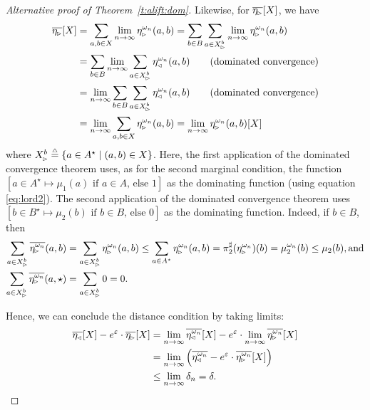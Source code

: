 \documentclass{lmcs}
\begin{document}
\begin{proof}[Alternative proof of Theorem~\ref{t:alift:dom}]
  Likewise, for $\overline{\eta\rside}[X]$, we have
  \begin{align*}
    \overline{\eta\rside}[X]
      &= \sum_{a, b \in X} \lim_{n \to \infty} \eta\rside^{\omega_n}(a, b)
       = \sum_{b \in B} \sum_{a \in X\rside^b} \lim_{n \to \infty} \eta\rside^{\omega_n}(a, b) \\
      &= \sum_{b \in B} \lim_{n \to \infty} \sum_{a \in X\rside^b} \eta\lside^{\omega_n}(a, b)
           \tag{dominated convergence} \\
      &= \lim_{n \to \infty} \sum_{b \in B} \sum_{a \in X\rside^b} \eta\lside^{\omega_n}(a, b)
           \tag{dominated convergence} \\
      &= \lim_{n \to \infty} \sum_{a, b \in X} \eta\rside^{\omega_n}(a, b)
       = \lim_{n \to \infty} \eta\rside^{\omega_n}(a, b)[X]
  \end{align*}
  where $X\rside^b \eqdef \{ a \in A^\star \mid (a, b) \in X \}$.
  Here, the first application of the dominated convergence theorem
  uses, as for the second marginal condition, the function
  $[a \in A^\star \mapsto
      \text{$\mu_1(a)$ if $a \in A$, else $1$}]$
  as the dominating function (using equation \eqref{eq:lord2}). The
  second application of the dominated convergence theorem uses
  $[b \in B^\star \mapsto
      \text{$\mu_2(b)$ if $b \in B$, else $0$}]$
  as the dominating function. Indeed, if $b \in B$, then
  \begin{align*}
    \sum_{a \in X\rside^b} \overline{\eta\rside^{\omega_n}}(a, b)
      &=    \sum_{a \in X\rside^b} \eta\rside^{\omega_n}(a, b)
       \leq \sum_{a \in A^\star} \eta\rside^{\omega_n}(a, b)
       =    \dsnd(\eta\rside^{\omega_n})(b) = \mu_2^{\omega_n}(b) \leq \mu_2(b), \text{and}\\
    \sum_{a \in X\rside^b} \overline{\eta\rside^{\omega_n}}(a, \star)
      &= \sum_{a \in X\rside^b} 0 = 0 .
  \end{align*}

  Hence, we can conclude the distance condition by taking limits:
  \begin{align*}
    \overline{\eta\lside}[X] - e^\epsilon \cdot \overline{\eta\rside}[X]
      &= \lim_{n \to \infty} \overline{\eta\lside^{\omega_n}}[X]
         - e^\epsilon \cdot \lim_{n \to \infty} \overline{\eta\rside^{\omega_n}}[X] \\
      &= \lim_{n \to \infty} \left(
           \overline{\eta\lside^{\omega_n}} - e^\epsilon \cdot
             \overline{\eta\rside^{\omega_n}}[X] \right)\\
      &\leq \lim_{n \to \infty} \delta_n = \delta . \qedhere
  \end{align*}
  
\end{proof}
\end{document}
